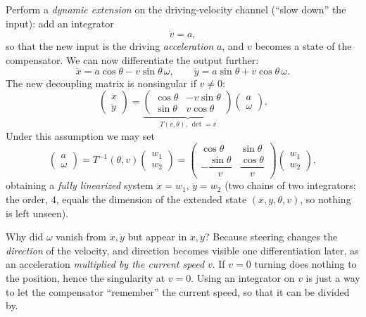 \documentclass[11pt,a4paper]{article}
\def\bm#1{#1}%
\def\vect#1{#1}%
\newcommand{\vect}[1]{\bm{#1}}
\theoremstyle{definition}
\theoremstyle{plain}
\theoremstyle{remark}
\begin{document}
Perform a \emph{dynamic extension} on the driving-velocity channel (``slow down'' the input): add an integrator
\[
\dot v=a,
\]
so that the new input is the driving \emph{acceleration} $a$, and $v$ becomes a state of the compensator. We can now differentiate the output further:
\[
\ddot x=a\cos\theta-v\sin\theta\,\omega,\qquad \ddot y=a\sin\theta+v\cos\theta\,\omega .
\]
The new decoupling matrix is nonsingular if $v\neq0$:
\[
\begin{pmatrix}\ddot x\\\ddot y\end{pmatrix}=\underbrace{\begin{pmatrix}\cos\theta&-v\sin\theta\\\sin\theta&v\cos\theta\end{pmatrix}}_{\vect T(v,\theta),\ \det=v}\begin{pmatrix}a\\\omega\end{pmatrix}.
\]
Under this assumption we may set
\[
\begin{pmatrix}a\\\omega\end{pmatrix}=\vect T^{-1}(\theta,v)\begin{pmatrix}w_1\\w_2\end{pmatrix}=\begin{pmatrix}\cos\theta&\sin\theta\\-\dfrac{\sin\theta}{v}&\dfrac{\cos\theta}{v}\end{pmatrix}\begin{pmatrix}w_1\\w_2\end{pmatrix},
\]
obtaining a \emph{fully linearized} system $\ddot x=w_1$, $\ddot y=w_2$ (two chains of two integrators; the order, 4, equals the dimension of the extended state $(x,y,\theta,v)$, so nothing is left unseen).

\begin{intuition}
Why did $\omega$ vanish from $\dot x,\dot y$ but appear in $\ddot x,\ddot y$? Because steering changes the \emph{direction} of the velocity, and direction becomes visible one differentiation later, as an acceleration \emph{multiplied by the current speed} $v$. If $v=0$ turning does nothing to the position, hence the singularity at $v=0$. Using an integrator on $v$ is just a way to let the compensator ``remember'' the current speed, so that it can be divided by.
\end{intuition}
\end{document}
